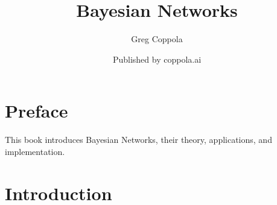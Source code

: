 \documentclass[12pt]{book}
\title{Bayesian Networks}
\author{Greg Coppola}
\date{Published by coppola.ai}
\begin{document}
\maketitle
\frontmatter
\chapter{Preface}
This book introduces Bayesian Networks, their theory, applications, and implementation.

\tableofcontents
\mainmatter
\chapter{Introduction}
\end{document}
